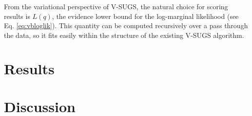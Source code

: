 \documentclass{uwstat572}
\begin{document}
From the variational perspective of V-SUGS, the natural choice for scoring results is $L(q)$, the evidence lower bound for the log-marginal likelihood (see Eq. \ref{eq:vbloglik}). This quantity can be computed recursively over a pass through the data, so it fits easily within the structure of the existing V-SUGS algorithm. 

\section{Results}

\section{Discussion}


\end{document}
